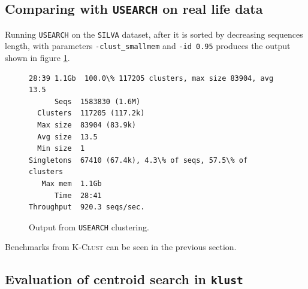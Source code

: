 \subsection{Comparing with \texttt{USEARCH} on real life data}
Running \texttt{USEARCH} on the \texttt{SILVA} dataset, after it is sorted by
decreasing sequences length, with parameters \texttt{-clust\_smallmem} and
\texttt{-id 0.95} produces the output shown in figure \ref{fig:uclust_silva}.

\begin{figure}[H]
\begin{lstlisting}[style=output-style]
28:39 1.1Gb  100.0\% 117205 clusters, max size 83904, avg 13.5
      Seqs  1583830 (1.6M)
  Clusters  117205 (117.2k)
  Max size  83904 (83.9k)
  Avg size  13.5
  Min size  1
Singletons  67410 (67.4k), 4.3\% of seqs, 57.5\% of clusters
   Max mem  1.1Gb
      Time  28:41
Throughput  920.3 seqs/sec.
\end{lstlisting}
\caption{Output from \texttt{USEARCH} clustering.}
\label{fig:uclust_silva}
\end{figure}

Benchmarks from \textsc{K-Clust} can be seen in the previous section.







\subsection{Evaluation of centroid search in \texttt{klust}}

